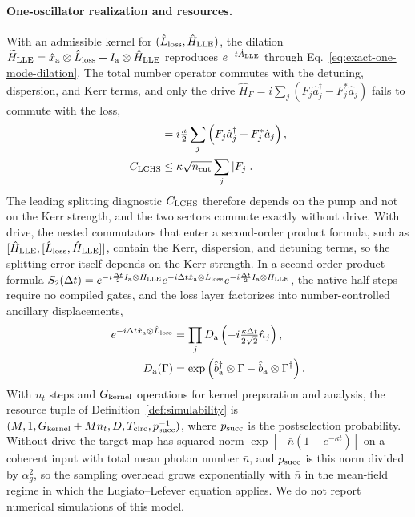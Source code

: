 \documentclass[pra,twocolumn,superscriptaddress,nofootinbib,floatfix]{revtex4-2}
\theoremstyle{remark}
\begin{document}
\paragraph{One-oscillator realization and resources.}
With an admissible kernel for \((\hat L_{\rm loss},\hat H_{\rm LLE})\), the dilation \(\widetilde H_{\rm LLE}=\hat x_{\rm a}\otimes\hat L_{\rm loss}+I_{\rm a}\otimes\hat H_{\rm LLE}\) reproduces \(e^{-t\hat A_{\rm LLE}}\) through Eq.~\eqref{eq:exact-one-mode-dilation}. The total number operator commutes with the detuning, dispersion, and Kerr terms, and only the drive \(\hat H_F=i\sum_j(F_j\hat a_j^\dagger-F_j^*\hat a_j)\) fails to commute with the loss,
\begin{align}
[\hat L_{\rm loss},\hat H_{\rm LLE}]&=i\tfrac{\kappa}{2}\sum_j\left(F_j\hat a_j^\dagger+F_j^*\hat a_j\right),\nonumber\\
C_{\rm LCHS}&\le\kappa\sqrt{n_{\rm cut}}\sum_j|F_j| .
\end{align}
The leading splitting diagnostic \(C_{\rm LCHS}\) therefore depends on the pump and not on the Kerr strength, and the two sectors commute exactly without drive. With drive, the nested commutators that enter a second-order product formula, such as \([\hat H_{\rm LLE},[\hat L_{\rm loss},\hat H_{\rm LLE}]]\), contain the Kerr, dispersion, and detuning terms, so the splitting error itself depends on the Kerr strength. In a second-order product formula \(S_2(\Delta t)=e^{-i\frac{\Delta t}{2}I_{\rm a}\otimes\hat H_{\rm LLE}}e^{-i\Delta t\hat x_{\rm a}\otimes\hat L_{\rm loss}}e^{-i\frac{\Delta t}{2}I_{\rm a}\otimes\hat H_{\rm LLE}}\), the native half steps require no compiled gates, and the loss layer factorizes into number-controlled ancillary displacements,
\begin{align}
e^{-i\Delta t\hat x_{\rm a}\otimes\hat L_{\rm loss}}&=\prod_{j}D_{\rm a}\left(-i\tfrac{\kappa\Delta t}{2\sqrt2}\hat n_j\right),\nonumber\\
D_{\rm a}(\Gamma)&=\exp\left(\hat b_{\rm a}^\dagger\otimes\Gamma-\hat b_{\rm a}\otimes\Gamma^\dagger\right).
\end{align}
With \(n_t\) steps and \(G_{\rm kernel}\) operations for kernel preparation and analysis, the resource tuple of Definition~\ref{def:simulability} is \((M,1,G_{\rm kernel}+Mn_t,D,T_{\rm circ},p_{\rm succ}^{-1})\), where \(p_{\rm succ}\) is the postselection probability. Without drive the target map has squared norm \(\exp[-\bar n(1-e^{-\kappa t})]\) on a coherent input with total mean photon number \(\bar n\), and \(p_{\rm succ}\) is this norm divided by \(\alpha_g^2\), so the sampling overhead grows exponentially with \(\bar n\) in the mean-field regime in which the Lugiato--Lefever equation applies. We do not report numerical simulations of this model.
\end{document}
